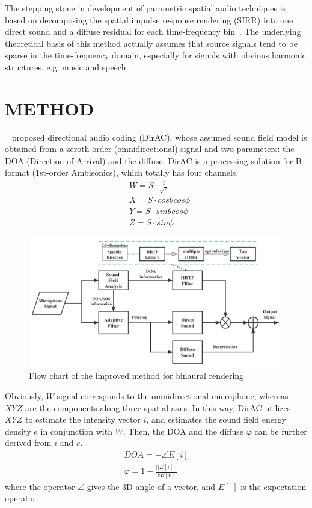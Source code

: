 \documentclass[10pt, a4paper, twocolumn]{article} %
\begin{document}
The stepping stone in development of parametric spatial audio techniques is based on decomposing the spatial impulse response rendering (SIRR) into one direct sound and a diffuse residual for each time-frequency bin~\parencite{Reference1}. The underlying theoretical basis of this method actually assumes that source signals tend to be sparse in the time-frequency domain, especially for signals with obvious harmonic structures, e.g. music and speech. 


\section{METHOD}

~\parencite{Reference2} proposed directional audio coding (DirAC), whose assumed sound field model is obtained from a zeroth-order (omnidirectional) signal and two parameters: the DOA (Direction-of-Arrival) and the diffuse. DirAC is a processing solution for B-format (1st-order Ambisonics), which totally has four channels.
\begin{align}
& W = S \cdot \frac{1}{\sqrt{2}} \\
& X = S \cdot cos{\theta}cos{\phi} \\
& Y = S \cdot sin{\theta}cos{\phi} \\
& Z = S \cdot sin{\phi}
\end{align}

\begin{figure}
	\includegraphics[width=\linewidth]{Figure1.png} %
	\caption{Flow chart of the improved method for binaural rendering} %
	\label{bear} %
\end{figure}

Obviously, $W$ signal corresponds to the omnidirectional microphone, whereas $XYZ$ are the components along three spatial axes. In this way, DirAC utilizes $XYZ$ to estimate the intensity vector $i$, and estimates the sound field energy density $e$ in conjunction with $W$. Then, the DOA and the diffuse $\varphi$ can be further derived from $i$ and $e$.
\begin{align}
DOA = -\angle{E[i]} \\
\varphi = 1 - \frac{||E[i]||}{cE[e]}
\end{align}
where the operator $\angle$ gives the 3D angle of a vector, and $E[\;]$ is the expectation operator.
\end{document}
